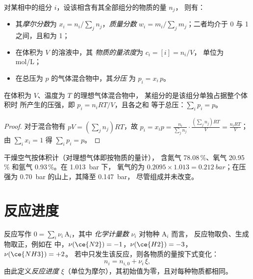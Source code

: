 \begin{definition}[组成变量]\label{def:b1:extent-q-and-k:composition}
对某相中的组分 $i$，设该相含有其全部组分的物质的量 $n_j$，
则有：
\begin{itemize}
  \item 其\emph{摩尔分数}为 $x_i = n_i/\sum_j
        n_j$，\emph{质量分数} $w_i =
        m_i/\sum_j m_j$；二者均介于 0 与 1 之间，且和为 1；
  \item 在体积为 $V$ 的溶液中，其
        \emph{物质的量浓度}为 $c_i = [i] = n_i/V$，
        单位为 \unit{mol/L}；
  \item 在总压为 $p$ 的气体混合物中，其\emph{分压}
        为 $p_i = x_i\,p$。
\end{itemize}
\end{definition}

\begin{proposition}[理想气体的分压]\label{prop:b1:extent-q-and-k:dalton}
在体积为 $V$、温度为 $T$ 的理想气体混合物中，
某组分的是该组分单独占据整个体积时
所产生的压强，即 $p_i = n_iRT/V$，且各之和
等于总压：$\sum_i p_i = p$。
\end{proposition}

\begin{proof}
对于混合物有 $pV = (\sum_j n_j)RT$，故 $p_i = x_i p = \frac{n_i}{\sum_j
n_j}\cdot\frac{(\sum_j n_j)RT}{V} = \frac{n_iRT}{V}$；由 $\sum_i x_i = 1$
得 $\sum_i p_i = p$。
\end{proof}

\begin{example}[空气]\label{ex:b1:extent-q-and-k:air}
干燥空气按体积计（对理想气体即按物质的量计），
含氮气 78.08\,\%、氧气 20.95\,\% 和氩气 0.93\,\%。在 \qty{1.013}{bar} 下，
氧气的为 $0.2095 \times
1.013 = \qty{0.212}{bar}$；在压强为
\qty{0.70}{bar} 的山上，其降至 \qty{0.147}{bar}，
尽管组成并未改变。
\end{example}

\section{反应进度}

\begin{definition}[化学计量数与反应进度]\label{def:b1:extent-q-and-k:extent}
反应写作 $0 = \sum_i \nu_i\,\mathrm{A}_i$，其中
\emph{化学计量数} $\nu_i$ 对物种 $\mathrm{A}_i$ 而言，
反应物取负、生成物取正，例如在
 中，$\nu(\ce{N2}) = -1$，$\nu(\ce{H2}) = -3$，
$\nu(\ce{NH3}) = +2$。
若中只发生该反应，则各物质的量按下式变化：
\[
  n_i = n_{i,0} + \nu_i\,\xi ,
\]
由此定义\emph{反应进度}
$\xi$（单位为摩尔），其初始值为零，且对每种物质都相同。
\end{definition}

